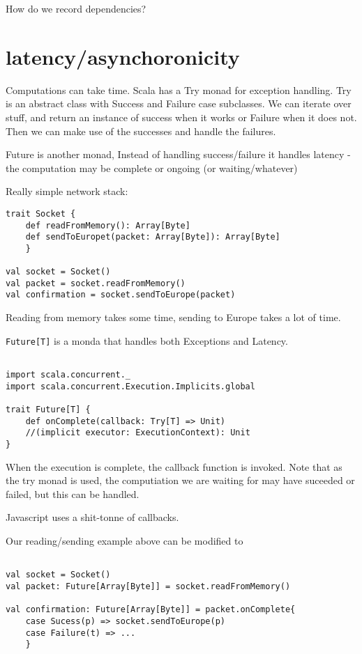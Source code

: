 \begin{lstlinsing}
\begin{lstlinsing}
How do we record dependencies?

\section{latency/asynchoronicity}
Computations can take time. 
Scala has a Try monad for exception handling. Try is an abstract class with Success and Failure case subclasses. We can iterate over stuff, and return an instance of success when it works or Failure when it does not. Then we can make use of the successes and handle the failures.

Future is another monad, Instead of handling success/failure it handles latency - the computation may be complete or ongoing (or waiting/whatever)

Really simple network stack:
\begin{lstlisting}
trait Socket {
	def readFromMemory(): Array[Byte]
	def sendToEuropet(packet: Array[Byte]): Array[Byte]
	}

val socket = Socket()
val packet = socket.readFromMemory()
val confirmation = socket.sendToEurope(packet)

\end{lstlisting}
Reading from memory takes some time, sending to Europe takes a lot of time.

\lstinline{Future[T]} is a monda that handles both Exceptions and Latency.

\begin{lstlisting}

import scala.concurrent._
import scala.concurrent.Execution.Implicits.global

trait Future[T] {
	def onComplete(callback: Try[T] => Unit)
	//(implicit executor: ExecutionContext): Unit
}
\end{lstlisting}

When the execution is complete, the callback function is invoked. Note that as the try monad is used, the computiation we are waiting for may have suceeded or failed, but this can be handled.

Javascript uses a shit-tonne of callbacks.

Our reading/sending example above can be modified to 
\begin{lstlisting}

val socket = Socket()
val packet: Future[Array[Byte]] = socket.readFromMemory()

val confirmation: Future[Array[Byte]] = packet.onComplete{
	case Sucess(p) => socket.sendToEurope(p)
	case Failure(t) => ...
	}
\end{lstlisting}


\end{lstlinsing}
\end{lstlinsing}
